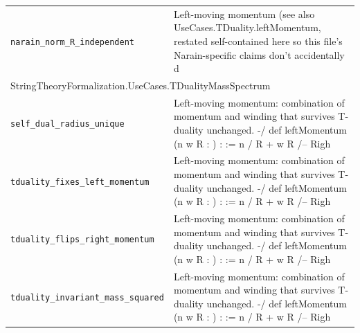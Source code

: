 \begin{longtable}{p{}p{}}
\quad\texttt{\footnotesize narain\_norm\_R\_independent} & {\footnotesize Left-moving momentum (see also UseCases.TDuality.leftMomentum, restated self-contained here so this file's Narain-specific claims don't accidentally d} \\
\multicolumn{2}{l}{\textsf{\small StringTheoryFormalization.UseCases.TDualityMassSpectrum}} \\
\quad\texttt{\footnotesize self\_dual\_radius\_unique} & {\footnotesize Left-moving momentum: combination of momentum and winding that survives T-duality unchanged. -/ def leftMomentum (n w R : ) :  := n / R + w R /-- Righ} \\
\quad\texttt{\footnotesize tduality\_fixes\_left\_momentum} & {\footnotesize Left-moving momentum: combination of momentum and winding that survives T-duality unchanged. -/ def leftMomentum (n w R : ) :  := n / R + w R /-- Righ} \\
\quad\texttt{\footnotesize tduality\_flips\_right\_momentum} & {\footnotesize Left-moving momentum: combination of momentum and winding that survives T-duality unchanged. -/ def leftMomentum (n w R : ) :  := n / R + w R /-- Righ} \\
\quad\texttt{\footnotesize tduality\_invariant\_mass\_squared} & {\footnotesize Left-moving momentum: combination of momentum and winding that survives T-duality unchanged. -/ def leftMomentum (n w R : ) :  := n / R + w R /-- Righ} \\
\end{longtable}
